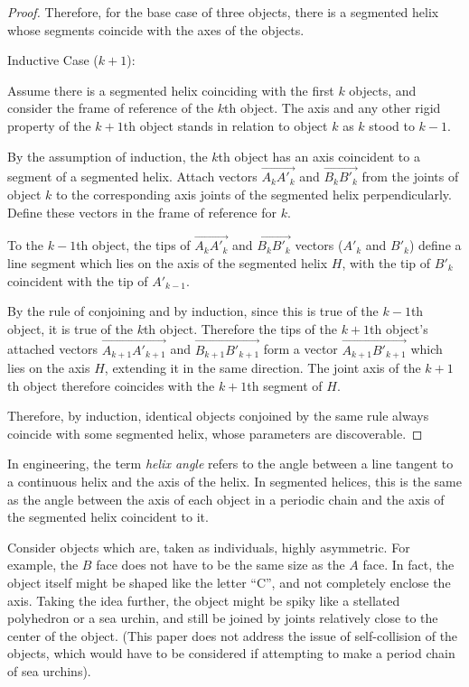 \documentclass[11pt]{article}
\begin{document}
{\begin{proof}
  Therefore, for the base case of three objects, there is a segmented helix whose
  segments coincide with the axes of the objects.


  Inductive Case ($k+1$):

  Assume there is a segmented helix coinciding with the first $k$ objects, and
  consider the frame of reference of the $k$th object. The axis and any
  other rigid property of the $k+1$th object stands in relation to object $k$
  as $k$ stood to $k-1$.

  By the assumption of induction, the $k$th object has an axis coincident to
  a segment
  of a segmented helix. Attach vectors $\overrightarrow{A_{k}A'_{k}}$ and $\overrightarrow{B_{k}B'_{k}}$
  from the
  joints of object $k$ to the corresponding axis joints of the segmented helix perpendicularly. Define these
  vectors in the frame of reference for $k$.

  To the $k-1$th object, the tips of  $\overrightarrow{A_{k}A'_{k}}$ and $\overrightarrow{B_{k}B'_{k}}$ vectors ($A'_{k}$ and $B'_{k}$) define
  a line segment which lies on the axis of the segmented helix $H$, with the
  tip of $B'_{k}$ coincident with the tip of $A'_{k-1}$.

  By the rule of conjoining and by induction, since this is true of the $k-1$th object,
  it is true of the $k$th object. Therefore the tips of the $k+1$th object's attached vectors
  $\overrightarrow{A_{k+1}A'_{k+1}}$ and $\overrightarrow{B_{k+1}B'_{k+1}}$
  form a vector $\overrightarrow{A_{k+1}B'_{k+1}}$ which lies on the axis $H$, extending it
  in the same direction. The joint axis of the $k+1$th object therefore coincides
  with the $k+1$th segment of $H$.

  Therefore, by induction, identical objects conjoined by the same rule always
  coincide with some segmented helix, whose parameters are discoverable.
\end{proof}

In engineering, the term {\em helix angle} refers
to the angle between a line tangent to a continuous helix and
the axis of the helix. In segmented helices, this is the same
as the angle between the
axis of each object in a periodic chain and the axis of the
segmented helix coincident to it.

Consider
objects which are, taken as individuals, highly asymmetric.
For example,
the $B$ face does not have to be the same size as the $A$ face. In fact,
the object itself might be shaped like the letter ``C'', and not completely
enclose the axis. Taking the idea further, the object might be spiky
like a stellated polyhedron or a sea urchin, and still be joined by
joints relatively close to the center of the object. (This paper does not
address the issue of self-collision of the objects,
which would have to be considered if attempting to make a period chain
of sea urchins).

}
\end{document}
